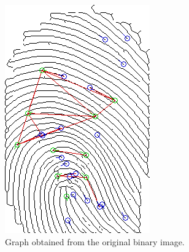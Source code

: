 \documentclass[8pt]{article}
\begin{document}
\begin{figure}
	\centering
	\begin{subfigure}{.38\textwidth}
		\centering
		\includegraphics[width=0.9\linewidth]{img/c-final}
		\caption{Graph obtained from the original binary image.}
					\label{fig:concl-c}
	\end{subfigure}%
	\hfill
	\begin{subfigure}{.38\textwidth}
		\centering

\end{subfigure}
\end{figure}
\end{document}
